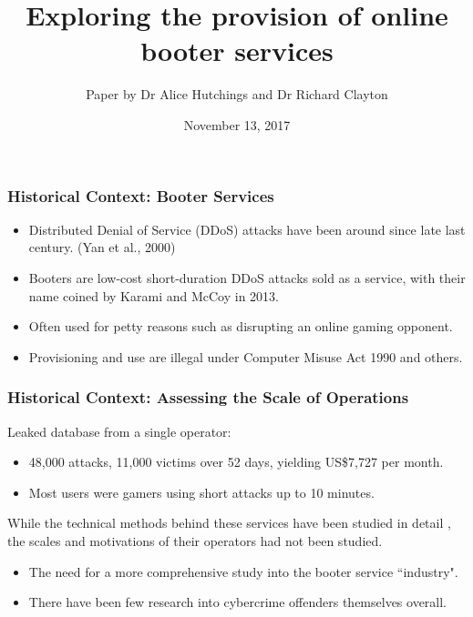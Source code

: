 \documentclass[aspectratio=1610]{beamer}
\title{Exploring the provision of online booter services}
\author{Paper by Dr Alice Hutchings and Dr Richard Clayton}
\institute{Presented by Chongyang Shi}
\date{November 13, 2017}
\begin{document}
 
\frame{\titlepage}
 
 
\begin{frame}
\frametitle{Historical Context: Booter Services}
\begin{itemize}
\setlength\itemsep{1em}
\item Distributed Denial of Service (DDoS) attacks have been around since late last century. (Yan et al., 2000) \cite{yan2000xenoservice}
\item Booters are low-cost short-duration DDoS attacks sold as a service, with their name coined by Karami and McCoy in 2013. \cite{karami2013understanding}
\item Often used for petty reasons such as disrupting an online gaming opponent. \cite[p. 1163]{hutchings2016exploring}
\item Provisioning and use are illegal under Computer Misuse Act 1990 and others.

\end{itemize}
\end{frame}

\begin{frame}
\frametitle{Historical Context: Assessing the Scale of Operations}
Leaked database from a single operator: \par
\begin{itemize}
\setlength\itemsep{1em}
\item48,000 attacks, 11,000 victims over 52 days, yielding US\$7,727 per month. 
\item Most users were gamers using short attacks up to 10 minutes.
\end{itemize}
\vspace{1em}
While the technical methods behind these services have been studied in detail \cite{karami2013understanding}, the scales and motivations of their operators had not been studied.
\begin{itemize}
\setlength\itemsep{1em}
\item The need for a more comprehensive study into the booter service ``industry".
\item There have been few research into cybercrime offenders themselves overall. \cite{holt2014assessment}
\end{itemize}
\end{frame}
\end{document}
